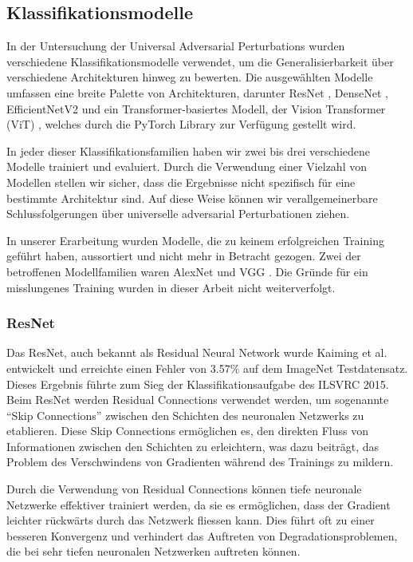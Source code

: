 \subsection{Klassifikationsmodelle} \label{chap:klassifikationsmodelle}

In der Untersuchung der Universal Adversarial Perturbations wurden verschiedene Klassifikationsmodelle verwendet, um die Generalisierbarkeit über verschiedene Architekturen hinweg zu bewerten. Die ausgewählten Modelle umfassen eine breite Palette von Architekturen, darunter ResNet \cite{he_deep_2015}, DenseNet \cite{huang_densely_2018}, EfficientNetV2 \cite{tan_efficientnetv2_2021} und ein Transformer-basiertes Modell, der Vision Transformer (ViT) \cite{dosovitskiy_image_2021}, welches durch die PyTorch Library zur Verfügung gestellt wird.

In jeder dieser Klassifikationsfamilien haben wir zwei bis drei verschiedene Modelle trainiert und evaluiert. Durch die Verwendung einer Vielzahl von Modellen stellen wir sicher, dass die Ergebnisse nicht spezifisch für eine bestimmte Architektur sind. Auf diese Weise können wir verallgemeinerbare Schlussfolgerungen über universelle adversarial Perturbationen ziehen.

In unserer Erarbeitung wurden Modelle, die zu keinem erfolgreichen Training geführt haben, aussortiert und nicht mehr in Betracht gezogen. Zwei der betroffenen Modellfamilien waren AlexNet \cite{krizhevsky_imagenet_2012} und VGG \cite{simonyan_very_2015}. Die Gründe für ein misslungenes Training wurden in dieser Arbeit nicht weiterverfolgt.


\subsubsection{ResNet}
Das ResNet, auch bekannt als Residual Neural Network wurde Kaiming et al. \cite{he_deep_2015} entwickelt und erreichte einen Fehler von 3.57\% auf dem ImageNet Testdatensatz. Dieses Ergebnis führte zum Sieg der Klassifikationsaufgabe des ILSVRC 2015. Beim ResNet werden Residual Connections verwendet werden, um sogenannte "`Skip Connections"' zwischen den Schichten des neuronalen Netzwerks zu etablieren. Diese Skip Connections ermöglichen es, den direkten Fluss von Informationen zwischen den Schichten zu erleichtern, was dazu beiträgt, das Problem des Verschwindens von Gradienten während des Trainings zu mildern.

Durch die Verwendung von Residual Connections können tiefe neuronale Netzwerke effektiver trainiert werden, da sie es ermöglichen, dass der Gradient leichter rückwärts durch das Netzwerk fliessen kann. Dies führt oft zu einer besseren Konvergenz und verhindert das Auftreten von Degradationsproblemen, die bei sehr tiefen neuronalen Netzwerken auftreten können.

